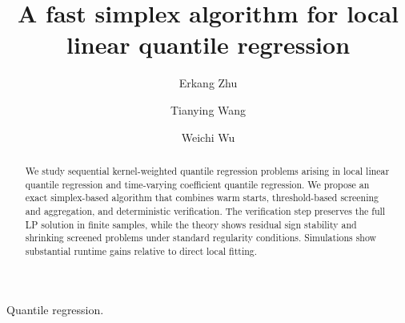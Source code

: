 \documentclass[lineno]{biometrika}
\begin{document}



\title{A fast simplex algorithm for local linear quantile regression}

\author{Erkang Zhu}

\author{Tianying Wang}

\author{Weichi Wu}

\maketitle

\begin{abstract}
We study sequential kernel-weighted quantile regression problems arising in local linear quantile
regression and time-varying coefficient quantile regression. We propose an exact simplex-based
algorithm that combines warm starts, threshold-based screening and aggregation, and deterministic
verification. The verification step preserves the full LP solution in finite samples, while the
theory shows residual sign stability and shrinking screened problems under standard regularity
conditions. Simulations show substantial runtime gains relative to direct local fitting.
\end{abstract}

\begin{keywords}
Quantile regression.
\end{keywords}
\end{document}
